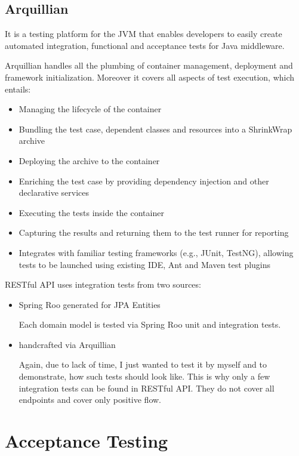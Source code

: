 	\subsection{Arquillian}
	
	It is a testing platform for the JVM that enables developers to easily create automated integration, functional and
	acceptance tests for Java middleware.
	
	Arquillian handles all the plumbing of container management, deployment and framework initialization. Moreover it
	covers all aspects of test execution, which entails:

	\begin{itemize}
		\item Managing the lifecycle of the container
		\item Bundling the test case, dependent classes and resources into a ShrinkWrap archive
		\item Deploying the archive to the container
		\item Enriching the test case by providing dependency injection and other declarative services
		\item Executing the tests inside the container
		\item Capturing the results and returning them to the test runner for reporting
		\item Integrates with familiar testing frameworks (e.g., JUnit, TestNG), allowing tests to be launched using existing
		IDE, Ant and Maven test plugins
	\end{itemize}
	
	RESTful API uses integration tests from two sources:
	
	\begin{itemize}
		\item Spring Roo generated for JPA Entities
		
		Each domain model is tested via Spring Roo unit and integration tests.
		\item handcrafted via Arquillian
		
		Again, due to lack of time, I just wanted to test it by myself and to demonstrate, how such tests should look like.
		This is why only a few integration tests can be found in RESTful API. They do not cover all endpoints and cover only
		positive flow.
	\end{itemize} 

	\section{Acceptance Testing}
	
